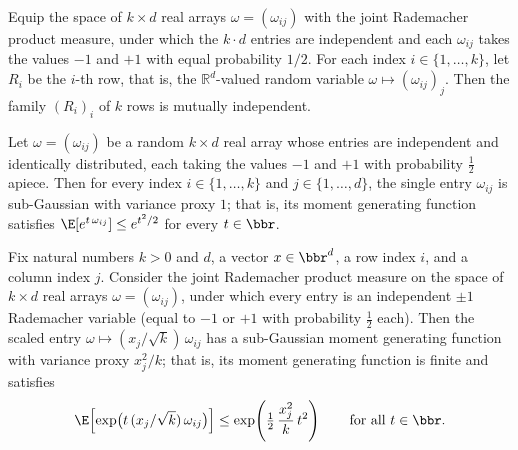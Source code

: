 \begin{lemma}
\label{radJointMeasure_rows_iid}
\leanok
{}
Equip the space of $k \times d$ real arrays $\omega = (\omega_{ij})$ with the joint
Rademacher product measure, under which the $k \cdot d$ entries are independent and each
$\omega_{ij}$ takes the values $-1$ and $+1$ with equal probability $1/2$. For each
index $i \in \{1,\dots,k\}$, let $R_i$ be the $i$-th row, that is, the
$\mathbb{R}^d$-valued random variable $\omega \mapsto (\omega_{ij})_{j}$. Then the
family $(R_i)_{i}$ of $k$ rows is mutually independent.
\end{lemma}

\begin{lemma}
\label{hasSubgaussianMGF_entry}
\leanok
{}
Let $\omega = (\omega_{ij})$ be a random $k \times d$ real array whose entries are
independent and identically distributed, each taking the values $-1$ and $+1$ with
probability $\tfrac{1}{2}$ apiece. Then for every index $i \in \{1,\dots,k\}$ and $j \in
\{1,\dots,d\}$, the single entry $\omega_{ij}$ is sub-Gaussian with variance proxy $1$;
that is, its moment generating function satisfies $\E\!\left[e^{t\,\omega_{ij}}\right]
\le e^{t^2/2}$ for every $t \in \bbr$.
\end{lemma}

\begin{lemma}
\label{hasSubgaussianMGF_scaled_entry}
\leanok
{}
Fix natural numbers $k > 0$ and $d$, a vector $x \in \bbr^d$, a row index $i$, and a
column index $j$. Consider the joint Rademacher product measure on the space of $k
\times d$ real arrays $\omega = (\omega_{ij})$, under which every entry is an
independent $\pm 1$ Rademacher variable (equal to $-1$ or $+1$ with probability
$\tfrac12$ each). Then the scaled entry $\omega \mapsto (x_j/\sqrt{k})\,\omega_{ij}$ has
a sub-Gaussian moment generating function with variance proxy $x_j^2/k$; that is, its
moment generating function is finite and satisfies \[
\E\!\left[\exp\!\big(t\,(x_j/\sqrt{k})\,\omega_{ij}\big)\right] \le
\exp\!\left(\tfrac{1}{2}\,\frac{x_j^2}{k}\,t^2\right) \qquad\text{for all } t \in \bbr.
\]
\end{lemma}

